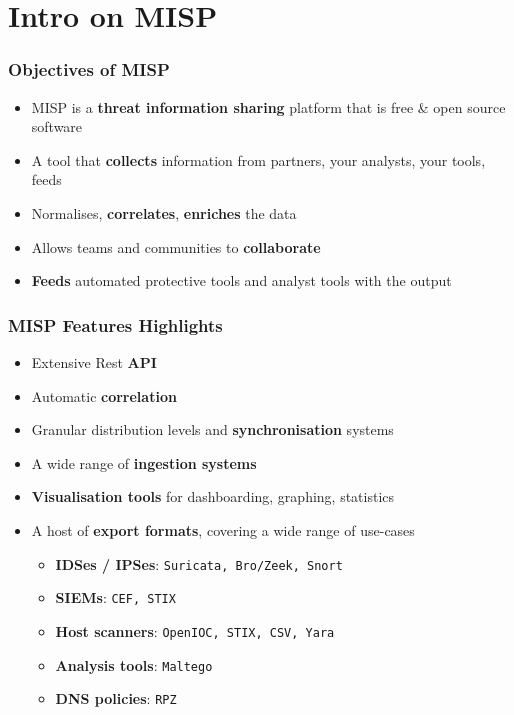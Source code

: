 \section{Intro on MISP}

\begin{frame}
\frametitle{Objectives of MISP}
\begin{itemize}
       \item MISP is a {\bf threat information sharing} platform that is free \& open source software
       \item A tool that {\bf collects} information from partners, your analysts, your tools, feeds
       \item Normalises, {\bf correlates}, {\bf enriches} the data
       \item Allows teams and communities to {\bf collaborate}
       \item {\bf Feeds} automated protective tools and analyst tools with the output
\end{itemize}
\end{frame}

\begin{frame}
\frametitle{MISP Features Highlights}
    \begin{itemize}
        \item Extensive Rest {\bf API}
        \item Automatic {\bf correlation}
        \item Granular distribution levels and {\bf synchronisation} systems
        \item A wide range of {\bf ingestion systems}
        \item {\bf Visualisation tools} for dashboarding, graphing, statistics
        \item A host of {\bf export formats}, covering a wide range of use-cases
        \begin{itemize}
            \item {\bf IDSes / IPSes}: \texttt{Suricata, Bro/Zeek, Snort}
            \item {\bf SIEMs}: \texttt{CEF, STIX}
            \item {\bf Host scanners}:  \texttt{OpenIOC, STIX, CSV, Yara}
            \item {\bf Analysis tools}: \texttt{Maltego}
            \item {\bf DNS policies}: \texttt{RPZ}
        \end{itemize}
    \end{itemize}
\end{frame}


